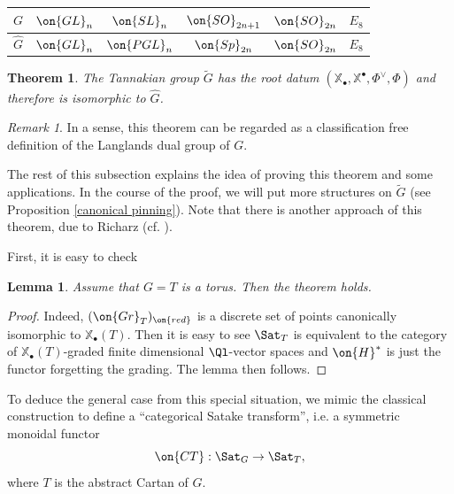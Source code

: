 \documentclass[]{pcmi}
\theoremstyle{plain}
\newtheorem{thm}[equation]{Theorem}
\newtheorem{lem}[equation]{Lemma}
\theoremstyle{remark}
\newtheorem{rmk}[equation]{Remark}
\theoremstyle{definition}
\newcommand{\Gr}{{\on{Gr}}}
\newcommand{\GL}{{\on{GL}}}
\def\xcoch{\mathbb{X}_\bullet}
\def\xch{\mathbb{X}^\bullet}
\begin{document}
\begin{center}
\begin{tabular}{| c | c | c | c | c | c |}
\hline 
$G$ & $\GL_n$ & $\on{SL}_n$ & $\on{SO}_{2n+1}$ & $\on{SO}_{2n}$ & $E_8$  \\ \hline 
$\hat G$ & $\GL_n$ & $\on{PGL}_{n}$ & $\on{Sp}_{2n}$ & $\on{SO}_{2n}$ & $E_8$ \\ \hline 
\end{tabular}
\end{center}


\begin{thm}\label{birth of dual group}
The Tannakian group $\tilde G$ has the root datum  $(\xcoch,\xch,\Phi^\vee,\Phi)$ and therefore is isomorphic to $\hat G$.
\end{thm}
\begin{rmk}
In a sense, this theorem can be regarded as a classification free definition of the Langlands dual group of $G$.
\end{rmk}

The rest of this subsection explains the idea of proving this theorem and some applications. In the course of the proof, we will put more structures on $\tilde G$ (see Proposition \ref{canonical pinning}). Note that there is another approach of this theorem, due to Richarz (cf. \cite[\S~3]{Ri}).


First, it is easy to check
\begin{lem}
Assume that $G=T$ is a torus. Then the theorem holds.
\end{lem}
\begin{proof}
Indeed, $(\Gr_T)_{\on{red}}$ is a discrete set of points canonically isomorphic to $\xcoch(T)$. Then it is easy to see $\Sat_T$ is equivalent to the category of $\xcoch(T)$-graded finite dimensional $\Ql$-vector spaces and $\on{H}^*$ is just the functor forgetting the grading. The lemma then follows.
\end{proof}


To deduce the general case from this special situation, we mimic the classical construction to define a ``categorical Satake transform'', i.e. a symmetric monoidal functor
\[\on{CT}:\Sat_G\to \Sat_T,\]
where $T$ is the abstract Cartan of $G$.
\end{document}
